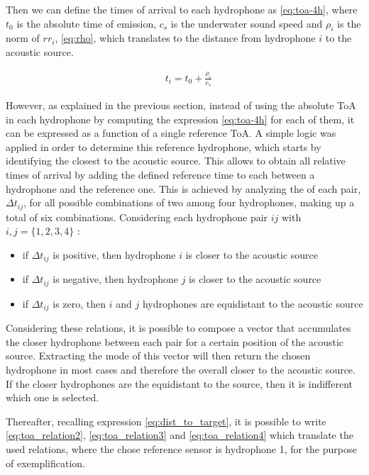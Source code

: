 Then we can define the times of arrival to each hydrophone as \ref{eq:toa-4h}, where $t_0$ is the absolute time of emission, $c_s$ is the underwater sound speed and $\rho_i$ is the norm of $rr_i$, \ref{eq:rho}, which translates to the distance from hydrophone $i$ to the acoustic source. 

\begin{eqnarray}
& t_i = t_0 +  \frac{\rho_i}{c_s}
\label{eq:toa-4h}
\end{eqnarray}

 However, as explained in the previous section, instead of using the absolute ToA in each hydrophone by computing the expression \ref{eq:toa-4h} for each of them, it can be expressed as a function of a single reference ToA. A simple logic was applied in order to determine this reference hydrophone, which starts by identifying the closest to the acoustic source. This allows to obtain all relative times of arrival by adding the defined reference time to each  between a hydrophone and the reference one. This is achieved by analyzing the  of each pair, $ \Delta t_{ij}$, for all possible combinations of two among four hydrophones, making up a total of six combinations. Considering each hydrophone pair $ij$ with $i, j= \{1,2,3,4\}$ :
 
 \begin{itemize}
 	\item if $ \Delta t_{ij}$ is positive, then hydrophone $i$ is closer to the acoustic source
 	\item if $ \Delta t_{ij}$ is negative, then hydrophone $j$ is closer to the acoustic source
 	\item if $ \Delta t_{ij}$ is zero, then $i$ and $j$ hydrophones are equidistant to the acoustic source
 \end{itemize}
 
Considering these relations, it is possible to compose a vector that accumulates the closer hydrophone between each pair for a certain position of the acoustic source. Extracting the mode of this vector will then return the chosen hydrophone in most cases and therefore the overall closer to the acoustic source. If the closer hydrophones are the equidistant to the source, then it is indifferent which one is selected.  

Thereafter, recalling expression \ref{eq:dist_to_target}, it is possible to write \ref{eq:toa_relation2}, \ref{eq:toa_relation3} and \ref{eq:toa_relation4} which translate the used relations, where  the chose reference sensor is hydrophone 1, for the purpose of exemplification.


